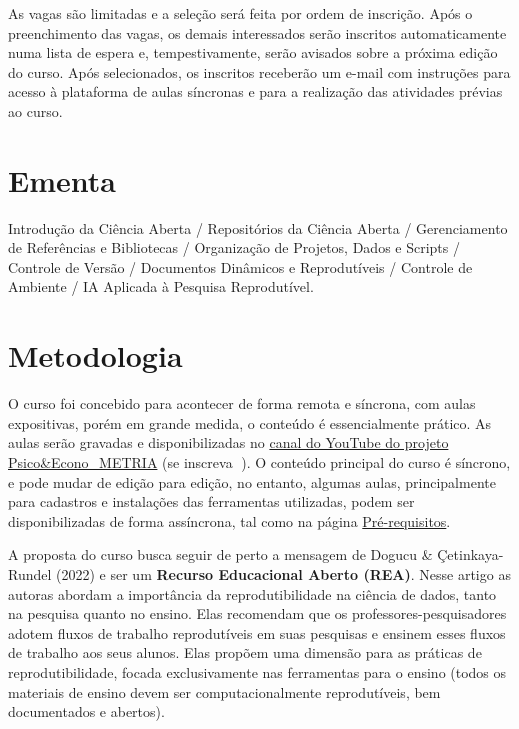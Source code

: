 \documentclass[
  a4paper,
]{book}
\newcommand{\emojitext}[1]{{\emoji #1}}
\begin{document}
As vagas são limitadas e a seleção será feita por ordem de inscrição.
Após o preenchimento das vagas, os demais interessados serão inscritos
automaticamente numa lista de espera e, tempestivamente, serão avisados
sobre a próxima edição do curso. Após selecionados, os inscritos
receberão um e-mail com instruções para acesso à plataforma de aulas
síncronas e para a realização das atividades prévias ao curso.

\section*{Ementa}\label{sec-ementa}


Introdução da Ciência Aberta / Repositórios da Ciência Aberta /
Gerenciamento de Referências e Bibliotecas / Organização de Projetos,
Dados e Scripts / Controle de Versão / Documentos Dinâmicos e
Reprodutíveis / Controle de Ambiente / IA Aplicada à Pesquisa
Reprodutível.

\section*{Metodologia}\label{sec-method}


O curso foi concebido para acontecer de forma remota e síncrona, com
aulas expositivas, porém em grande medida, o conteúdo é essencialmente
prático. As aulas serão gravadas e disponibilizadas no
\href{https://www.youtube.com/c/PsicoEconoMETRIA}{canal do YouTube do
projeto Psico\&Econo\_METRIA} (se inscreva \emojitext{🥰}). O conteúdo
principal do curso é síncrono, e pode mudar de edição para edição, no
entanto, algumas aulas, principalmente para cadastros e instalações das
ferramentas utilizadas, podem ser disponibilizadas de forma assíncrona,
tal como na página \href{00-prework.html}{Pré-requisitos}.

A proposta do curso busca seguir de perto a mensagem de Dogucu \&
Çetinkaya-Rundel (2022) e ser um \textbf{Recurso Educacional Aberto
(REA)}. Nesse artigo as autoras abordam a importância da
reprodutibilidade na ciência de dados, tanto na pesquisa quanto no
ensino. Elas recomendam que os professores-pesquisadores adotem fluxos
de trabalho reprodutíveis em suas pesquisas e ensinem esses fluxos de
trabalho aos seus alunos. Elas propõem uma dimensão para as práticas de
reprodutibilidade, focada exclusivamente nas ferramentas para o ensino
(todos os materiais de ensino devem ser computacionalmente
reprodutíveis, bem documentados e abertos).
\end{document}
